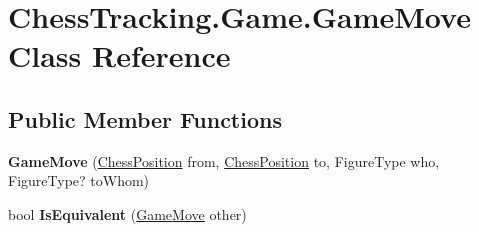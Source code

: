 \hypertarget{class_chess_tracking_1_1_game_1_1_game_move}{}\section{Chess\+Tracking.\+Game.\+Game\+Move Class Reference}
\label{class_chess_tracking_1_1_game_1_1_game_move}
\subsection*{Public Member Functions}
\begin{DoxyCompactItemize}
\item 
\mbox{\label{class_chess_tracking_1_1_game_1_1_game_move_aa03677b0401a655c6e990cda267b6a02}} 
{\bfseries Game\+Move} (\mbox{\hyperlink{class_chess_tracking_1_1_game_1_1_chess_position}{Chess\+Position}} from, \mbox{\hyperlink{class_chess_tracking_1_1_game_1_1_chess_position}{Chess\+Position}} to, Figure\+Type who, Figure\+Type? to\+Whom)
\item 
\mbox{\label{class_chess_tracking_1_1_game_1_1_game_move_ad7de5b5a8e90b6c51167ff2233fd7d6f}} 
bool {\bfseries Is\+Equivalent} (\mbox{\hyperlink{class_chess_tracking_1_1_game_1_1_game_move}{Game\+Move}} other)
\end{DoxyCompactItemize}
